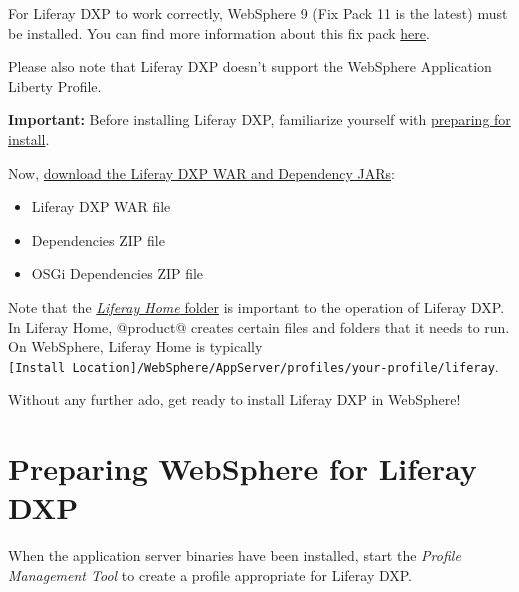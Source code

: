 \noindent\hrulefill

For Liferay DXP to work correctly, WebSphere 9 (Fix Pack 11 is the
latest) must be installed. You can find more information about this fix
pack
\href{http://www-01.ibm.com/support/docview.wss?uid=swg24043005}{here}.

Please also note that Liferay DXP doesn't support the WebSphere
Application Liberty Profile.

\noindent\hrulefill

\textbf{Important:} Before installing Liferay DXP, familiarize yourself
with
\href{/docs/7-2/deploy/-/knowledge_base/d/preparing-for-install}{preparing
for install}.

\noindent\hrulefill

Now,
\href{/docs/7-2/deploy/-/knowledge_base/d/obtaining-product\#downloading-the-liferay-war-and-dependency-jars}{download
the Liferay DXP WAR and Dependency JARs}:

\begin{itemize}
\tightlist
\item
  Liferay DXP WAR file
\item
  Dependencies ZIP file
\item
  OSGi Dependencies ZIP file
\end{itemize}

Note that the
\href{docs/7-2/deploy/-/knowledge_base/d/liferay-home}{\emph{Liferay
Home} folder} is important to the operation of Liferay DXP. In Liferay
Home, @product@ creates certain files and folders that it needs to run.
On WebSphere, Liferay Home is typically
\texttt{{[}Install\ Location{]}/WebSphere/AppServer/profiles/your-profile/liferay}.

Without any further ado, get ready to install Liferay DXP in WebSphere!

\section{Preparing WebSphere for Liferay
DXP}\label{preparing-websphere-for-liferay-dxp}

When the application server binaries have been installed, start the
\emph{Profile Management Tool} to create a profile appropriate for
Liferay DXP.

